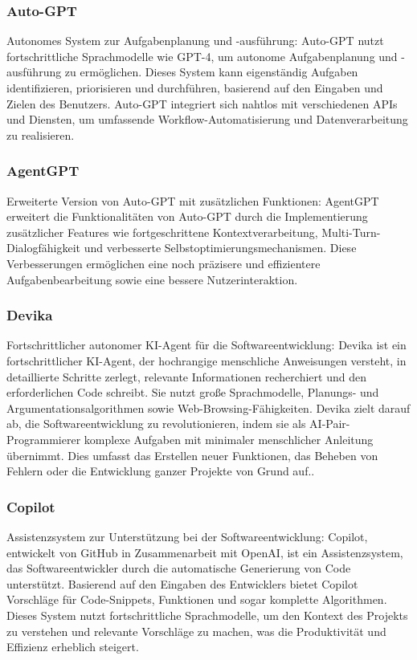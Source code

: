 \documentclass[conference]{IEEEtran}
\begin{document}
\subsubsection{Auto-GPT}
Autonomes System zur Aufgabenplanung und -ausführung: Auto-GPT nutzt fortschrittliche Sprachmodelle wie GPT-4, um autonome Aufgabenplanung und -ausführung zu ermöglichen. Dieses System kann eigenständig Aufgaben identifizieren, priorisieren und durchführen, basierend auf den Eingaben und Zielen des Benutzers. Auto-GPT integriert sich nahtlos mit verschiedenen APIs und Diensten, um umfassende Workflow-Automatisierung und Datenverarbeitung zu realisieren\cite{significant_gravitas_autogpt_2024}.

\subsubsection{AgentGPT}
Erweiterte Version von Auto-GPT mit zusätzlichen Funktionen: AgentGPT erweitert die Funktionalitäten von Auto-GPT durch die Implementierung zusätzlicher Features wie fortgeschrittene Kontextverarbeitung, Multi-Turn-Dialogfähigkeit und verbesserte Selbstoptimierungsmechanismen. Diese Verbesserungen ermöglichen eine noch präzisere und effizientere Aufgabenbearbeitung sowie eine bessere Nutzerinteraktion\cite{noauthor_reworkdagentgpt_nodate}.

\subsubsection{Devika}
Fortschrittlicher autonomer KI-Agent für die Softwareentwicklung: Devika ist ein fortschrittlicher KI-Agent, der hochrangige menschliche Anweisungen versteht, in detaillierte Schritte zerlegt, relevante Informationen recherchiert und den erforderlichen Code schreibt. Sie nutzt große Sprachmodelle, Planungs- und Argumentationsalgorithmen sowie Web-Browsing-Fähigkeiten. Devika zielt darauf ab, die Softwareentwicklung zu revolutionieren, indem sie als AI-Pair-Programmierer komplexe Aufgaben mit minimaler menschlicher Anleitung übernimmt. Dies umfasst das Erstellen neuer Funktionen, das Beheben von Fehlern oder die Entwicklung ganzer Projekte von Grund auf.\cite{noauthor_stitionaidevika_2024}.

\subsubsection{Copilot}
Assistenzsystem zur Unterstützung bei der Softwareentwicklung: Copilot, entwickelt von GitHub in Zusammenarbeit mit OpenAI, ist ein Assistenzsystem, das Softwareentwickler durch die automatische Generierung von Code unterstützt. Basierend auf den Eingaben des Entwicklers bietet Copilot Vorschläge für Code-Snippets, Funktionen und sogar komplette Algorithmen. Dieses System nutzt fortschrittliche Sprachmodelle, um den Kontext des Projekts zu verstehen und relevante Vorschläge zu machen, was die Produktivität und Effizienz erheblich steigert\cite{noauthor_github_2024}.
\end{document}
